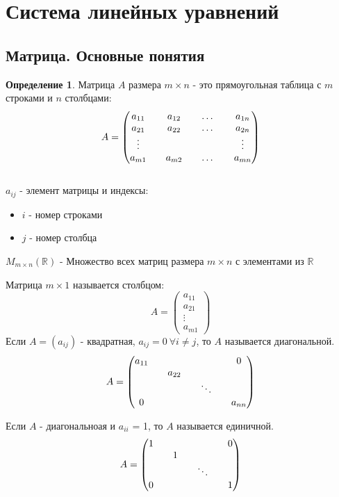 \documentclass[a4paper, 12pt]{article}
\newcommand{\R}{\mathbb R}
\theoremstyle{definition}
\newtheorem*{definition}{Определение}
\begin{document}
  \section{Система линейных уравнений}
  \subsection{Матрица. Основные понятия}
  \begin{definition}
    Матрица $A$ размера $m\times n$ - это прямоугольная таблица с $m$ строками и $n$ столбцами:
    $$ A= \begin{pmatrix}
      a_{11} && a_{12} && \dots && a_{1n}\\
      a_{21} && a_{22} && \dots && a_{2n}\\
      \vdots && \null && \null && \vdots\\
      a_{m1} && a_{m2} && \dots && a_{mn}
    \end{pmatrix}$$ \\
    $a_{ij}$ - элемент матрицы и индексы:

    \begin{itemize}
      \item $i$ - номер строками
      \item $j$ - номер столбца
    \end{itemize}
    
    $M_{m\times n}(\R)$ - Множество всех матриц размера $m\times n$ с элементами из $\R$
    \end{definition}
    Матрица $m\times 1$ называется столбцом:
    $$ A= 
    \begin{pmatrix}
      a_{11} \\
      a_{21} \\
      \vdots \\
      a_{m1} 
    \end{pmatrix} $$
    Если $A=(a_{ij})$ - квадратная, $a_{ij} = 0\ \forall i \neq j$, то $A$ называется диагональной.
    $$ A =
    \begin{pmatrix}
      a_{11} && \null && \null && 0 \\
      \null && a_{22} && \null && \null \\
      \null && \null && \ddots && \null \\
      0 && \null && \null && a_{nn} 
    \end{pmatrix} $$

    Если $A$ - диагональноая и $a_{ii}$ = 1, то $A$ называется единичной.
    $$ A =
    \begin{pmatrix}
      1 && \null && \null && 0 \\
      \null && 1 && \null && \null \\
      \null && \null && \ddots && \null \\
      0 && \null && \null && 1 
    \end{pmatrix} $$
\end{document}
